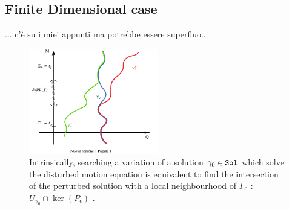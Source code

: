 \documentclass[Main]{subfiles}
\begin{document}
	\subsection{Finite Dimensional case}
	 ... c'è su i miei appunti ma potrebbe essere superfluo.. 
	 
	 
	 
		\begin{figure}[h!]
				  \centering
   			\includegraphics[width=0.5\textwidth]{Pictures/AdvRetSol} 
   	  		\caption{Intrinsically, searching a variation of a solution $\gamma_0\in \mathtt{Sol}$ which solve the disturbed motion equation is equivalent to find the intersection of the perturbed solution with a local neighbourhood of $\Gamma_0$ : $U_{\gamma_0}\cap\ker(P_\epsilon)$ .}
		\end{figure}			
	
	
\newpage
\end{document}
